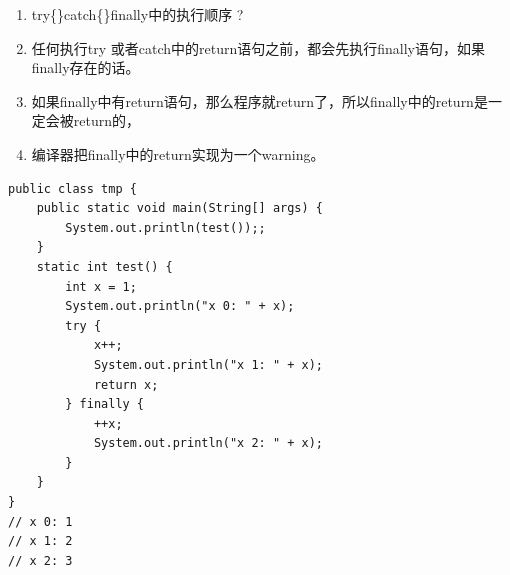 \documentclass[9pt, b5paper]{article}
\begin{document}
\begin{enumerate}
\item try\{\}catch\{\}finally中的执行顺序 ?
\item 任何执行try 或者catch中的return语句之前，都会先执行finally语句，如果finally存在的话。
\item 如果finally中有return语句，那么程序就return了，所以finally中的return是一定会被return的，
\item 编译器把finally中的return实现为一个warning。
\end{enumerate}
\begin{verbatim}
public class tmp {
    public static void main(String[] args) {
        System.out.println(test());;
    }
    static int test() {
        int x = 1;
        System.out.println("x 0: " + x);
        try {
            x++;
            System.out.println("x 1: " + x);
            return x;
        } finally {
            ++x;
            System.out.println("x 2: " + x);
        }
    }
}
// x 0: 1
// x 1: 2
// x 2: 3
\end{verbatim}
\end{document}
